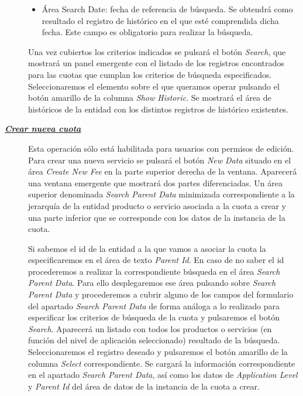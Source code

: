 \begin{description}
\begin{itemize}
\begin{itemize}
	\end{itemize}	    	
	\item Área Search Date: fecha de referencia de búsqueda. Se obtendrá como resultado el registro de histórico en el que esté comprendida dicha fecha. Este campo es obligatorio para realizar la búsqueda.
\end{itemize}

Una vez cubiertos los criterios indicados se pulsará el botón \emph{Search}, que mostrará un panel emergente con el listado de los registros encontrados para las cuotas que cumplan los criterios de búsqueda especificados. Seleccionaremos el elemento sobre el que queramos operar pulsando el botón amarillo de la columna \emph{Show Historic}. Se mostrará el área de históricos de la entidad con los distintos registros de histórico existentes.


\item[\underline{\textsl{\textbf{Crear nueva cuota}}}] Esta operación sólo está habilitada para usuarios con permisos de edición.
Para crear una nueva servicio se pulsará el botón \textit{New Data} situado en el área \emph{Create New Fee} en la parte superior derecha de la ventana. Aparecerá una ventana emergente que mostrará dos partes diferenciadas. Un área superior denominada \emph{Search Parent Data} minimizada correspondiente a la jerarquía de la entidad producto o servicio asociada a la cuota a crear y una parte inferior que se corresponde con los datos de la instancia de la cuota.

Si sabemos el id de la entidad a la que vamos a asociar la cuota la especificaremos en el área de texto \emph{Parent Id}. En caso de no saber el id procederemos a realizar la correspondiente búsqueda en el área  \emph{Search Parent Data}. Para ello desplegaremos ese área pulsando sobre \emph{Search Parent Data} y procederemos a cubrir alguno de los campos del formulario del apartado \emph{Search Parent Data} de forma análoga a lo realizado para especificar los criterios de búsqueda de la cuota y pulsaremos el botón \emph{Search}. Aparecerá un listado con todos los productos o servicios (en función del nivel de aplicación seleccionado) resultado de la búsqueda. Seleccionaremos el registro deseado y pulsaremos el botón amarillo de la columna \emph{Select} correspondiente. Se cargará la información correspondiente en el apartado \emph{Search Parent Data}, así como los datos de \emph{Application Level} y \emph{Parent Id} del área de datos de la instancia de la cuota a crear.


\end{description}
